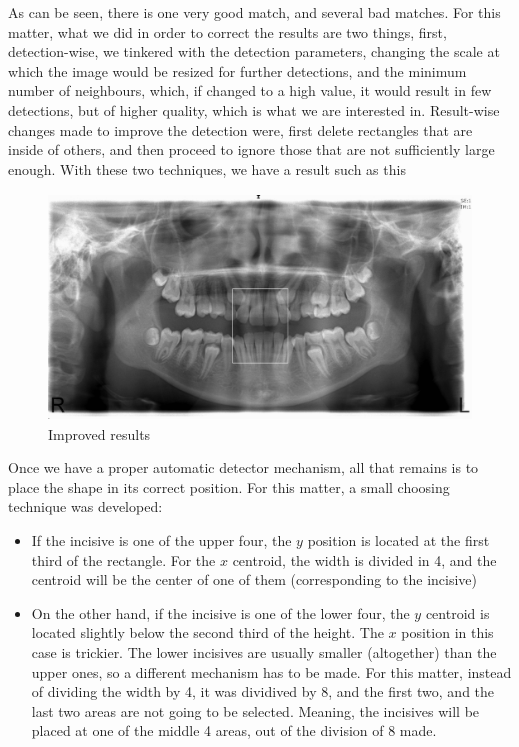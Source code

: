 As can be seen, there is one very good match, and several bad matches. For this
matter, what we did in order to correct the results are two things, 
first, detection-wise, we tinkered with the detection parameters, changing the
scale at which the image would be resized for further detections, and the
minimum number of neighbours, which, if changed to a high value, it would result
in few detections, but of higher quality, which is what we are interested in.
Result-wise changes made to improve the detection were, first delete rectangles
that are inside of others, and then proceed to ignore those that are not
sufficiently large enough. With these two techniques, we have a result such as
this

\begin{figure}[h]
  \centering
  \includegraphics[height=6cm]{img/teeth_detection_2}
  \caption{Improved results}
\end{figure}

Once we have a proper automatic detector mechanism, all that remains is to place
the shape in its correct position. For this matter, a small choosing technique
was developed:
\begin{itemize}
  \item If the incisive is one of the upper four, the $y$ position is located at
the first third of the rectangle. For the $x$ centroid, the width is divided in 4,
and the centroid will be the center of one of them (corresponding to the
incisive)
  \item On the other hand, if the incisive is one of the lower four, the $y$
centroid is located slightly below the second third of the height. The $x$
position in this case is trickier. The lower incisives are usually smaller
(altogether) than the upper ones, so a different mechanism has to be made. For
this matter, instead of dividing the width by 4, it was dividived by 8, and the
first two, and the last two areas are not going to be selected. Meaning, the
incisives will be placed at one of the middle 4 areas, out of the division of 8
made.  
\end{itemize}

